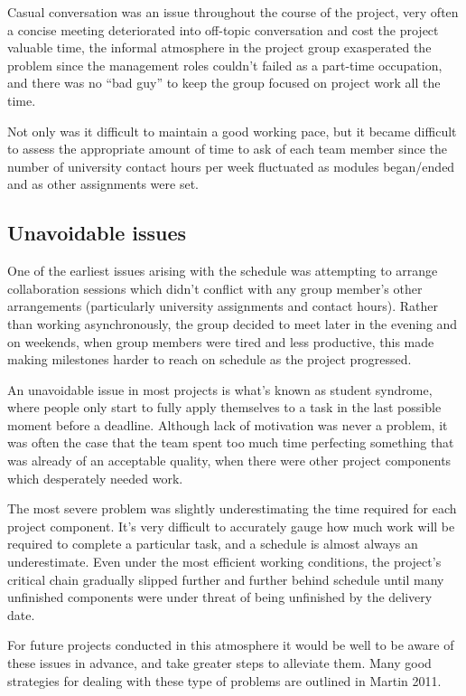 Casual conversation was an issue throughout the course of the project, very often a concise meeting deteriorated into off-topic conversation and cost the project valuable time, the informal atmosphere in the project group exasperated the problem since the management roles couldn't failed as a part-time occupation, and there was no ``bad guy'' to keep the group focused on project work all the time.

Not only was it difficult to maintain a good working pace, but it became difficult to assess the appropriate amount of time to ask of each team member since the number of university contact hours per week fluctuated as modules began/ended and as other assignments were set.

\subsection{Unavoidable issues}
One of the earliest issues arising with the schedule was attempting to arrange collaboration sessions which didn't conflict with any group member's other arrangements (particularly university assignments and contact hours). Rather than working asynchronously, the group decided to meet later in the evening and on weekends, when group members were tired and less productive, this made making milestones harder to reach on schedule as the project progressed.

An unavoidable issue in most projects is what's known as student syndrome, where people only start to fully apply themselves to a task in the last possible moment before a deadline.\cite{maylor2010} Although lack of motivation was never a problem, it was often the case that the team spent too much time perfecting something that was already of an acceptable quality, when there were other project components which desperately needed work.

The most severe problem was slightly underestimating the time required for each project component. It's very difficult to accurately gauge how much work will be required to complete a particular task, and a schedule is almost always an underestimate. Even under the most efficient working conditions, the project's critical chain gradually slipped further and further behind schedule until many unfinished components were under threat of being unfinished by the delivery date.\cite{goldratt}

For future projects conducted in this atmosphere it would be well to be aware of these issues in advance, and take greater steps to alleviate them. Many good strategies for dealing with these type of problems are outlined in Martin 2011.

